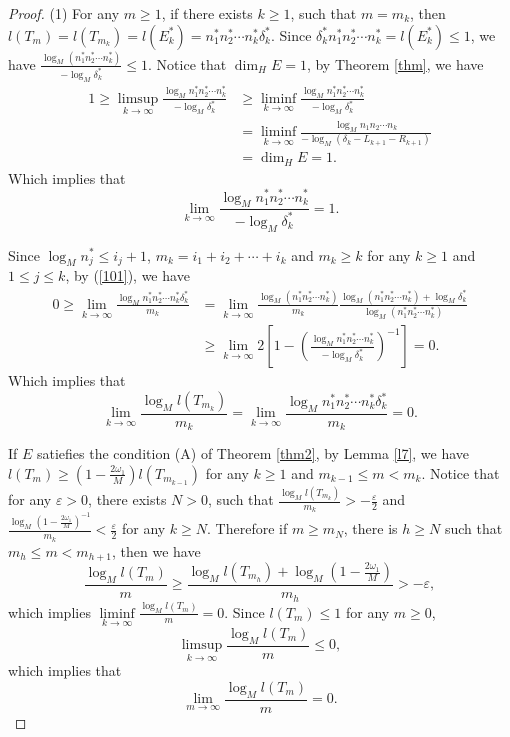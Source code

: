\documentclass[reqno]{amsart}
\theoremstyle{plain}
\theoremstyle{definition}
\theoremstyle{remark}
\numberwithin{equation}{section} \DeclareMathOperator\intr{int}
\begin{document}
\begin{proof}
(1)
For any $m\ge 1$, if there exists $k\ge1$, such that $m=m_{k}$, then $l(T_m )=l(T_{m_k}) =l(E^*_k)=n^*_1n^*_2\cdots n^*_k\delta^*_k$. Since $\delta^*_kn^*_1n^*_2\cdots n^*_k=l(E^*_k)\le 1$, we have $\frac{\log_M(n^*_1n^*_2\cdots n^*_k)}{-\log_M\delta^*_k}\le 1.$ Notice that $\dim_{H}E=1$, by Theorem \ref{thm}, we have
\begin{equation}\begin{aligned}
1\ge\limsup\limits_{k \to\infty}  \frac{\log_M n^*_1n^*_2\cdots n^*_k}{-\log_M\delta^*_k}&\ge\liminf\limits_{k \to\infty}  \frac{\log_M n^*_1n^*_2\cdots n^*_k}{-\log_M\delta^*_k}\\& =\liminf\limits_{k \to\infty}  \frac{\log_M n_1n_2\cdots n_k}{-\log_M(\delta_k-L_{k+1}-R_{k+1})}\\& =\dim_{H}E=1.
\end{aligned}
\end{equation}
Which implies that \begin{equation}\label{101}
\lim_{k \to\infty}  \frac{\log_M n^*_1n^*_2\cdots n^*_k}{-\log_M\delta^*_k}=1.
\end{equation}

Since $\log_Mn^*_j\le i_j+1$, $m_k=i_1+i_2+\cdots+i_k$ and $m_k\ge k$ for any $k\ge 1$ and $1\le j \le k$, by (\ref{101}), we have
\begin{equation*}
\begin{aligned}
0\ge\lim_{k \to \infty} \frac{\log_M n^*_1n^*_2\cdots n^*_k\delta^*_k}{m_k} & = \lim_{k \to \infty}\frac{\log_M(n^*_1n^*_2\cdots n^*_k)}{m_k}\frac{\log_M(n^*_1n^*_2\cdots n^*_k)+\log_M\delta^*_k}{\log_M(n^*_1n^*_2\cdots n^*_k)}\\
&\ge \lim_{k \to \infty}2[1-( \frac{\log_M n^*_1n^*_2\cdots n^*_k}{-\log_M\delta^*_k})^{-1}]
=0.
\end{aligned}
\end{equation*}
Which implies that \begin{equation}\label{102}
\lim_{k \to \infty}\frac{\log_{M}l(T_{m_k}) }{m_k}=\lim_{k \to \infty} \frac{\log_M n^*_1n^*_2\cdots n^*_k\delta^*_k}{m_k}=0.
\end{equation}

If $E$ satiefies the condition {\rm(A)} of Theorem {\rm\ref{thm2}}, by Lemma \ref{l7}, we have $l(T_m) \ge(1-\frac{2\omega_1}{M})l(T_{m_{k-1}})$ for any $k\ge1 $ and $m_{k-1}\le m<m_k$. Notice that for any $\varepsilon>0$, there exists $N>0$, such that
$\frac{\log_{M} l(T_{m_k}) }{m_k}>-\frac{\varepsilon }{2} $ and $\frac{\log_{M}(1-\frac{2\omega_1}{M})^{-1} }{m_k}<\frac{\varepsilon }{2} $ for any $k\ge N$.
 Therefore if $m\ge m_{N}$, there is $h\ge N$ such that $m_h \le m < m_{h+1}$, then we have $$\frac{\log_M l(T_m)}{m}\ge\frac{\log_M l(T_{m_h})+\log_M(1-\frac{2\omega_1}{M})}{m_h}>-\varepsilon ,$$
which implies $\liminf\limits_{k \to\infty}   \frac{\log_M l(T_m ) }{m}=0$.
Since $l(T_m)\le 1$ for any $m\ge 0$,
$$\limsup\limits_{k \to\infty}  \frac{\log_M l(T_m) }{m}\le 0,$$ which implies that $$\lim_{m \to \infty} \frac{\log_M l(T_m) }{m}=0.$$







\end{proof}
\end{document}
